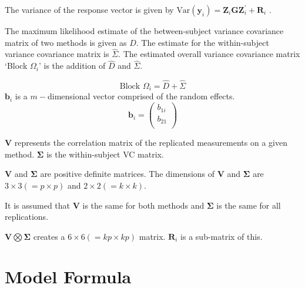 \documentclass[12pt, a4paper]{report}
\theoremstyle{plain}
\theoremstyle{definition}
\theoremstyle{remark}
\begin{document}
The variance of the response vector is given by $\mbox{Var}(\boldsymbol{y}_i)  = \boldsymbol{Z}_i \boldsymbol{G} \boldsymbol{Z}_i^{\prime} + \boldsymbol{R}_i$ \citep{hamlett}.


The maximum likelihood estimate of the between-subject variance
covariance matrix of two methods is given as $D$. The estimate for
the within-subject variance covariance matrix is $\hat{\Sigma}$.
The estimated overall variance covariance matrix `Block $\Omega_{i}$' is the addition of $\hat{D}$ and $\hat{\Sigma}$.

\begin{equation}
\mbox{Block  }\Omega_{i} = \hat{D} + \hat{\Sigma}
\end{equation}
$\boldsymbol{b}_{i}$ is a $m-$dimensional vector comprised of
the random effects.
\begin{equation}
\boldsymbol{b}_{i} = \left( \begin{array}{c}
b_{1i} \\
b_{21}  \\
\end{array}\right)
\end{equation}


$\boldsymbol{V}$ represents the correlation matrix of the replicated measurements on a given method.
$\boldsymbol{\Sigma}$ is the within-subject VC matrix.\\
\bigskip


$\boldsymbol{V}$ and $\boldsymbol{\Sigma}$ are positive
definite matrices. The dimensions of $\boldsymbol{V}$ and
$\boldsymbol{\Sigma}$ are $3 \times 3 ( = p \times p )$ and $ 2 \times
2 (= k \times k)$.\\
\bigskip


It is assumed that $\boldsymbol{V}$ is the same for both methods and $\boldsymbol{\Sigma}$ is
the same for all replications.\\
\bigskip

$\boldsymbol{V} \bigotimes \boldsymbol{\Sigma}$ creates a $ 6 \times 6 ( = kp \times
kp)$ matrix.
$\boldsymbol{R}_{i}$ is a sub-matrix of this.\\
\bigskip



\section{Model Formula}
\end{document}
